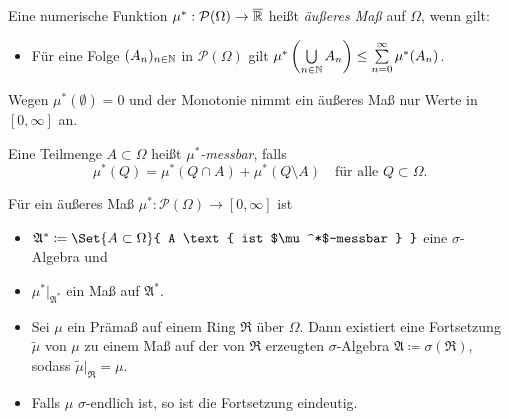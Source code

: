 \documentclass{cheat-sheet}
\newcommand{\Alg}{\mathfrak{A}} %
\newcommand{\Ring}{\mathfrak{R}} %
\begin{document}

\begin{defn}
  Eine numerische Funktion $\mu^* : \mathcal{P}(\Omega) \to \overline{\mathbb{R}}$ heißt \emph{äußeres Maß} auf $\Omega$, wenn gilt:
  \begin{itemize}
    \item Für eine Folge $(A_n)_{n \in \mathbb{N}}$ in $\mathcal{P}(\Omega)$ gilt $\mu^*\left(\bigcup_{n \in \N} A_n \right) \leq \sum_{n = 0}^\infty \mu^*(A_n)$. %
  \end{itemize}
\end{defn}

\begin{bem}
  Wegen $\mu^*(\emptyset) = 0$ und der Monotonie nimmt ein äußeres Maß nur Werte in $[0, \infty]$ an.
\end{bem}

\begin{defn}
  Eine Teilmenge $A \subset \Omega$ heißt \emph{$\mu^*$-messbar}, falls
  \[ \mu^*(Q) = \mu^*(Q \cap A) + \mu^*(Q \setminus A) \quad \text{für alle } Q \subset \Omega. \]
\end{defn}

\begin{satz}[Carathéodory]
  Für ein äußeres Maß $\mu^* : \mathcal{P}(\Omega) \to [0, \infty]$ ist
  \begin{itemize}
    \item $\Alg^* \coloneqq \Set{ A \subset \Omega }{ A \text{ ist $\mu^*$-messbar } }$ eine $\sigma$-Algebra und
    \item $\mu^*|_{\Alg^*}$ ein Maß auf $\Alg^*$.
  \end{itemize}
\end{satz}

\begin{satz}
  \begin{itemize}
    \item Sei $\mu$ ein Prämaß auf einem Ring $\Ring$ über $\Omega$. Dann existiert eine Fortsetzung $\widetilde{\mu}$ von $\mu$ zu einem Maß auf der von $\Ring$ erzeugten $\sigma$-Algebra $\Alg \coloneqq \sigma(\Ring)$, sodass $\widetilde{\mu}|_{\Ring} = \mu$.
    \item Falls $\mu$ $\sigma$-endlich ist, so ist die Fortsetzung eindeutig.
  \end{itemize}
\end{satz}
\end{document}
